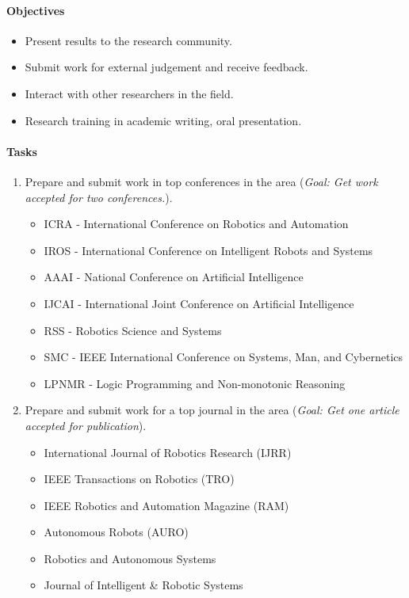 \paragraph{Objectives}
\begin{itemize}
\item Present results to the research community.
\item Submit work for external judgement and receive feedback.
\item Interact with other researchers in the field.
\item Research training in academic writing, oral presentation.
\end{itemize}
\paragraph{Tasks}
\begin{enumerate}[label= T10-\Alph*:]
\item Prepare and submit work in top conferences in the area (\textit{Goal: Get work accepted for two conferences.}).
\begin{itemize}
\item ICRA - International Conference on Robotics and Automation
\item IROS - International Conference on Intelligent Robots and Systems 
\item AAAI - National Conference on Artificial Intelligence
\item IJCAI - International Joint Conference on Artificial Intelligence
\item RSS - Robotics Science and Systems
\item SMC - IEEE International Conference on Systems, Man, and Cybernetics
\item LPNMR - Logic Programming and Non-monotonic Reasoning
\end{itemize}
\item Prepare and submit work for a top journal in the area (\textit{Goal: Get one article accepted for publication}).
\begin{itemize}
\item International Journal of Robotics Research (IJRR)
\item IEEE Transactions on Robotics (TRO)
\item IEEE Robotics and Automation Magazine (RAM)
\item Autonomous Robots (AURO)
\item Robotics and Autonomous Systems
\item Journal of Intelligent & Robotic Systems
\end{itemize}
\end{enumerate}


